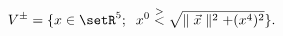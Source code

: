 \begin{equation}
V^\pm=\{ x\in \setR^5;\;\; x^0\stackrel{>}{<}\sqrt{\parallel \vec
x\parallel^2+(x^4)^2} \}.
\label{cone}
\end{equation}

